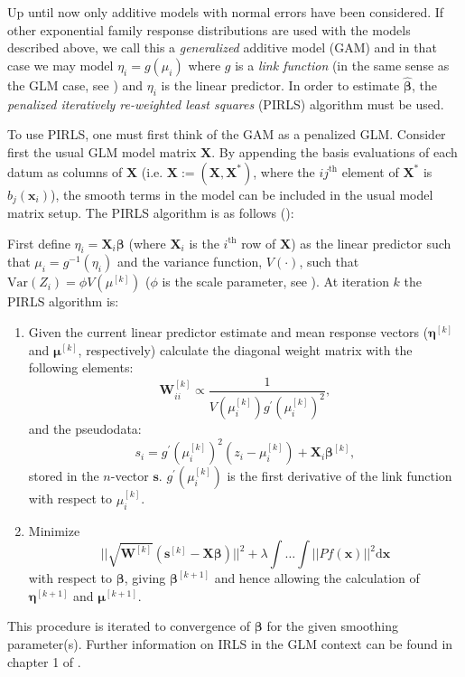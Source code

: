 Up until now only additive models with normal errors have been considered. If other exponential family response distributions are used with the models described above, we call this a \textit{generalized} additive model (GAM)  and in that case we may model $\eta_i=g(\mu_i)$ where $g$ is a \textit{link function} (in the same sense as the GLM case, see \cite[p. 8]{GEEbook}) and $\eta_i$ is the linear predictor. In order to estimate $\bm{\hat{\beta}}$, the \textit{penalized iteratively re-weighted least squares} (PIRLS) algorithm must be used. 

To use PIRLS, one must first think of the GAM as a penalized GLM. Consider first the usual GLM model matrix $\mathbf{X}$. By appending the basis evaluations of each datum as columns of $\mathbf{X}$ (i.e. $\mathbf{X}:=\left ( \mathbf{X},\mathbf{X}^* \right )$, where the $ij^\text{th}$ element of $\mathbf{X}^*$ is  $b_j(\mathbf{x}_i)$), the smooth terms in the model can be included in the usual model matrix setup. The PIRLS algorithm is as follows (\cite[p. 138]{simonbook}):

First define $\eta_i = \mathbf{X}_i\bm{\beta}$ (where $\mathbf{X}_i$ is the $i^\text{th}$ row of $\mathbf{X}$) as the linear predictor such that $\mu_i = g^{-1}(\eta_i)$ and the variance function, $V(\cdot)$, such that $\text{Var}\left ( Z_i \right ) = \phi V(\mu^{[k]})$ ($\phi$ is the scale parameter, see \cite[p. 62]{simonbook}). At iteration $k$ the PIRLS algorithm is:
\begin{enumerate}
\item Given the current linear predictor estimate and mean response vectors ($\bm{\eta}^{[k]}$ and $\bm{\mu}^{[k]}$, respectively) calculate the diagonal weight matrix with the following elements:
\begin{equation*}
\mathbf{W}^{[k]}_{ii}  \propto \frac{1}{V(\mu_i^{[k]})g^\prime(\mu_i^{[k]})^2},
\end{equation*}
and the pseudodata:
\begin{equation*}
s_i = g^\prime(\mu_i^{[k]})^2(z_i-\mu_i^{[k]}) + \mathbf{X}_i\bm{\beta}^{[k]},
\end{equation*}
stored in the $n$-vector $\mathbf{s}$. $g^\prime(\mu_i^{[k]})$ is the first derivative of the link function with respect to $\mu_i^{[k]}$.
\item Minimize
\begin{equation*}
\lvert \lvert \sqrt{\mathbf{W}^{[k]}} (\mathbf{s}^{[k]} - \mathbf{X}\bm{\beta})  \rvert \rvert^2 + \lambda \int \dots \int \lvert \lvert P f(\mathbf{x})\rvert \rvert^2 \text{d}\mathbf{x}
\end{equation*}
with respect to $\bm{\beta}$, giving $\bm{\beta}^{[k+1]}$ and hence allowing the calculation of $\bm{\eta}^{[k+1]}$ and $\bm{\mu}^{[k+1]}$.
\end{enumerate}
This procedure is iterated to convergence of $\bm{\beta}$ for the given smoothing parameter(s). Further information on IRLS in the GLM context can be found in chapter 1 of .

